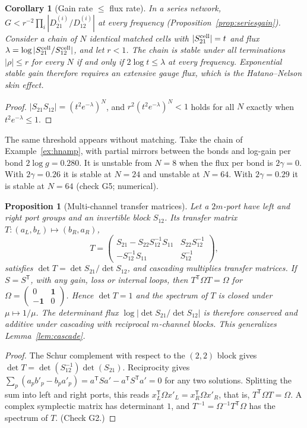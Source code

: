 \documentclass[11pt]{article}
\newtheorem{proposition}[theorem]{Proposition}
\newtheorem{corollary}[theorem]{Corollary}
\theoremstyle{definition}
\theoremstyle{remark}
\newcommand{\one}{\mathbf 1}
\newcommand{\T}{\mathsf T}
\begin{document}
\begin{corollary}[Gain rate $\le$ flux rate]\label{cor:rate}
In a series network, $G<r^{-2}\prod_i|D^{(i)}_{21}/D^{(i)}_{12}|$ at every frequency (Proposition~\ref{prop:seriesgain}). Consider a chain of $N$ identical matched cells with $|S^{\rm cell}_{21}|=t$ and flux $\lambda=\log|S^{\rm cell}_{21}/S^{\rm cell}_{12}|$, and let $r<1$. The chain is stable under all terminations $|\rho|\le r$ for every $N$ if and only if $2\log t\le\lambda$ at every frequency. Exponential stable gain therefore requires an extensive gauge flux, which is the Hatano--Nelson skin effect.
\end{corollary}
\begin{proof}
$|S_{21}S_{12}|=(t^2e^{-\lambda})^N$, and $r^2(t^2e^{-\lambda})^N<1$ holds for all $N$ exactly when $t^2e^{-\lambda}\le1$.
\end{proof}

The same threshold appears without matching. Take the chain of Example~\ref{ex:hnamp}, with partial mirrors between the bonds and log-gain per bond $2\log g=0.280$. It is unstable from $N=8$ when the flux per bond is $2\gamma=0$. With $2\gamma=0.26$ it is stable at $N=24$ and unstable at $N=64$. With $2\gamma=0.29$ it is stable at $N=64$ (check G5; numerical).

\begin{proposition}[Multi-channel transfer matrices]\label{prop:multi}
Let a $2m$-port have left and right port groups and an invertible block $S_{12}$. Its transfer matrix $T:(a_L,b_L)\mapsto(b_R,a_R)$,
\[
T=\begin{pmatrix}S_{21}-S_{22}S_{12}^{-1}S_{11}&S_{22}S_{12}^{-1}\\-S_{12}^{-1}S_{11}&S_{12}^{-1}\end{pmatrix},
\]
satisfies $\det T=\det S_{21}/\det S_{12}$, and cascading multiplies transfer matrices. If $S=S^\T$, with any gain, loss or internal loops, then $T^\T\Omega T=\Omega$ for $\Omega=\left(\begin{smallmatrix}0&\one\\-\one&0\end{smallmatrix}\right)$. Hence $\det T=1$ and the spectrum of $T$ is closed under $\mu\mapsto1/\mu$. The determinant flux $\log|\det S_{21}/\det S_{12}|$ is therefore conserved and additive under cascading with reciprocal $m$-channel blocks. This generalizes Lemma~\ref{lem:cascade}.
\end{proposition}
\begin{proof}
The Schur complement with respect to the $(2,2)$ block gives $\det T=\det(S_{12}^{-1})\det(S_{21})$. Reciprocity gives $\sum_p(a_pb'_p-b_pa'_p)=a^\T Sa'-a^\T S^\T a'=0$ for any two solutions. Splitting the sum into left and right ports, this reads $x_L^\T\Omega x'_L=x_R^\T\Omega x'_R$, that is, $T^\T\Omega T=\Omega$. A complex symplectic matrix has determinant $1$, and $T^{-1}=\Omega^{-1}T^\T\Omega$ has the spectrum of $T$. (Check G2.)
\end{proof}
\end{document}
